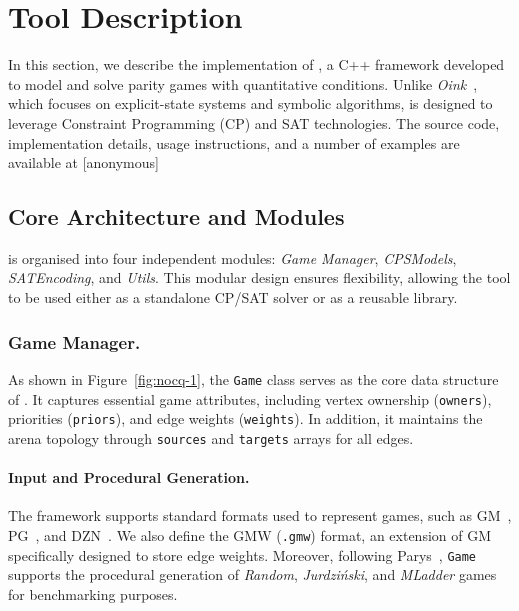 \documentclass[a4paper,UKenglish,cleveref, autoref, thm-restate]{lipics-v2021}
\begin{document}
\section{Tool Description}

In this section, we describe the implementation of \nocq, a C++ framework developed to model and solve parity games with quantitative conditions. Unlike \emph{Oink}~\cite{vanDijk:2018}, which focuses on explicit-state systems and symbolic algorithms, \nocq is designed to leverage Constraint Programming (CP) and SAT technologies. The source code, implementation details, usage instructions, and a number of examples are available at [anonymous]

\subsection*{Core Architecture and Modules}

\nocq is organised into four independent modules: \emph{Game Manager}, \emph{CPSModels}, \emph{SATEncoding}, and \emph{Utils}. This modular design ensures flexibility, allowing the tool to be used either as a standalone CP/SAT solver or as a reusable library.


\subsubsection*{Game Manager.}

As shown in Figure~\ref{fig:nocq-1}, the \texttt{Game} class serves as the core data structure of \nocq. It captures essential game attributes, including vertex ownership (\texttt{owners}), priorities (\texttt{priors}), and edge weights (\texttt{weights}). In addition, it maintains the arena topology through \texttt{sources} and \texttt{targets} arrays for all edges.

\paragraph{Input and Procedural Generation.}
The framework supports standard formats used to represent games, such as GM~\cite{Parys:2019}, PG~\cite{vanDijk:2018}, and DZN~\cite{Minizinc:2020}. We also define the GMW (\texttt{.gmw}) format, an extension of GM specifically designed to store edge weights.
%
Moreover, 
following Parys~\cite{Parys:2019}, \texttt{Game} supports the procedural generation of \emph{Random}, \emph{Jurdziński}, and \emph{MLadder} games for benchmarking purposes.
\end{document}
